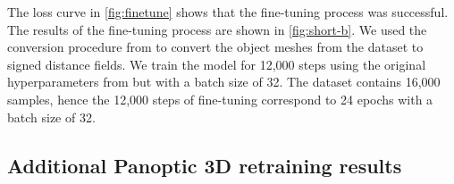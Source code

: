 The loss curve in \cref{fig:finetune} shows that the fine-tuning process was successful. The results of the fine-tuning process are shown in \cref{fig:short-b}.
We used the conversion procedure from \citet{cheng2023sdfusion} to convert the object meshes from the dataset to signed distance fields.
We train the model for 12,000 steps using the original hyperparameters from \citet{cheng2023sdfusion} but with a batch size of 32.
The dataset contains 16,000 samples, hence the 12,000 steps of fine-tuning correspond to 24 epochs with a batch size of 32.

\newpage

\subsection{Additional Panoptic 3D retraining results}




